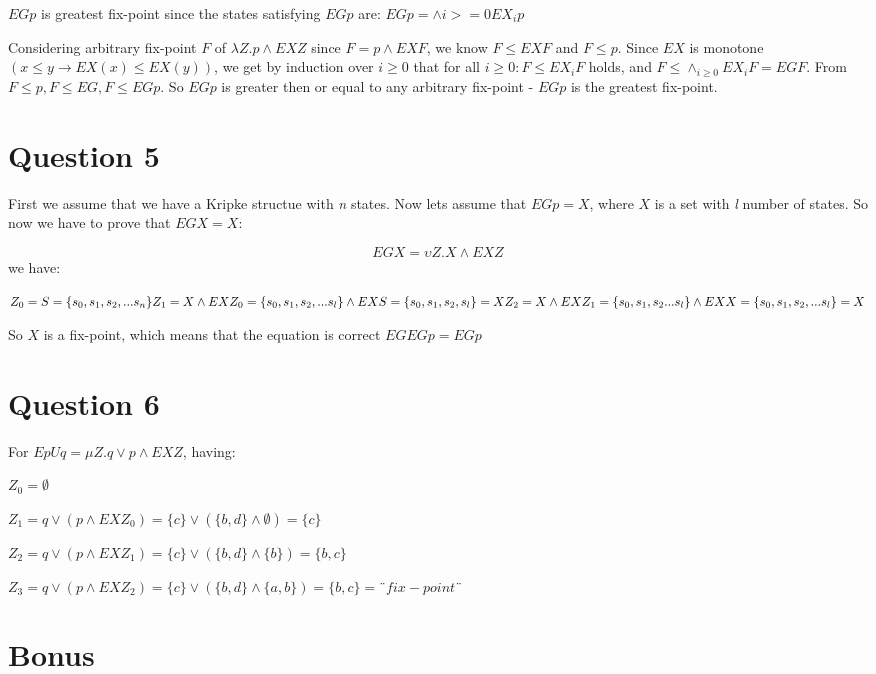 \documentclass[a4paper]{article}
\begin{document}
$EG p$ is greatest fix-point since the states satisfying $EG p$ are: $EG p=\land i >= 0EX_{i}p$

Considering arbitrary fix-point $F$ of $\lambda Z.p \land EX Z$ since $F=p \land EX F$, we know $F \leq EX F$ and $F \leq p$. Since $EX$ is monotone $( x \leq y \to EX(x) \leq EX(y))$, we get by induction over $i \geq 0$ that for all $i \geq 0: F \leq EX_i F$ holds, and $F \leq \land_{i \geq 0} EX_iF=EG F$. From $F\leq p, F\leq EG, F\leq EG p$. So $EG p$ is greater then or equal to any arbitrary fix-point - $EG p$ is the greatest fix-point.

\section{Question 5}

First we assume that we have a Kripke structue with \textit{n} states. Now lets assume that $EG p=X$, where $X$ is a set with \textit{l} number of states. So now we have to prove that $EG X=X$:

\[
EG X = \upsilon Z.X \land EX Z 
\] we have: 


$
Z_0=S=\{s_0,s_1,s_2,...s_n\} \\
Z_1=X \land EX Z_0 = \{s_0,s_1,s_2,...s_l\} \land EX S = \{s_0,s_1,s_2, s_l\}=X \\ 
Z_2=X \land EX Z_1= \{s_0,s_1,s_2...s_l\} \land EX X = \{s_0,s_1,s_2,... s_l\}=X \\
$

So $X$ is a fix-point, which means that the equation is correct $EG EG p = EG p$

 
\section{Question 6}

For $E p U q= \mu Z. q \lor p \land EX Z $, having:

$Z_0=\emptyset $

$Z_1=q \lor (p \land EX Z_0)=\{c\} \lor (\{ b, d \} \land \emptyset)=\{c\} $

$Z_2=q \lor (p \land EX Z_1)=\{c\} \lor (\{b, d\} \land \{b\})=\{b,c\} $

$Z_3=q \lor (p \land EX Z_2)=\{c\} \lor (\{b, d\} \land \{a, b\})=\{b,c\}=¨fix-point¨   $

\section{Bonus}
\end{document}
